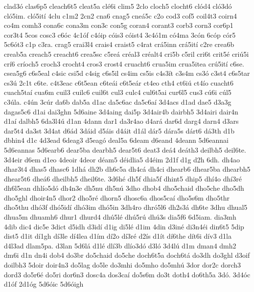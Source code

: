 {clad3^^f3
clas6p5
cleach6t5
cleat5a
cl^^e96i
clim5
2clo
cloch5
clocht6
cl^^f3d4
cl^^f33d^^f3
cl^^f35im.
cl^^f35it^^ed
4clu
c1m2
2cn2
cna6
cnag5
cne^^e15c
c2o
cod3
cof5
coil4t3
coirn4
co4m
comh3
cona6c
cona3m
con3c
con5g
coran4
corant3
corb3
corn3
cor6p1
cor3t4
5cos
cosc3
c6^^f3c
4c1^^f3f
c4^^f3ip
c^^f3is3
c^^f3ist4
3c4^^f31m
c^^f34ma
3c^^f3n
6c^^f3p
c^^f3r5
5c6^^f3t3
c1p
c3ra.
crag5
crai3l4
crais4
craist5
c4rat
cr^^e15inn
cr^^e15it^^ed
c2re
crea6b
creab5a
creach5
creacht6
crea5sc
c5re^^e1
cr^^e9al3
cr^^e9alt4
cri5b
c5ril
cri6t
crit5^^e9
cri^^fa5i
cr^^ed6
cr^^edoch5
croch3
crocht4
cros3
crost4
cruacht6
crua5im
crua5itea
cr^^fa5it^^ed
c6se.
csea5g6
c6s5eal
c4sic
csi5d
c4sig
c6s5il
cs4im
cs5is
c4s3^^edt
c3s4m
cs3^^f3
c3st4
c6s5tar
cs3^^fa
2c1t
c6te.
c4t3eac
c6t5ean
c6te^^e1i
c6t5e^^e1r
ct4eo
cth4
ct6i^^fa
ct4^^edo
cuacht6
cuach5ta^^ed
cua6m
cuil3
cuilc6
cuil6t
cul3
culc4
cul6t5ai
cur6l5
cus3
c^^fa6i
c^^fal5
c3^^fala.
c4^^fan
3c^^far
da6b
dab5a
d1ac
da5c6ac
da5c6a^^ed
3d4acs
d1ad
dae5
d3a3g
dagas5c6
d1ai
dai3ghn
5d6aine
3d4aing
dai5p
3d4air4b
dairbh5
3d4airi
dair4n
d1a^^ed
dalbh5
6da3l4^^fa
d1an
4dann
dar1
da3r4ao
d4ar^^e1
dar6d
darg4
darn4
d3ars
dar5t4
da3st
3d4at
d6^^e1d
3d^^e1id
d5^^e1is
d4^^e1it
d1^^e1l
d^^e1r5
d^^e1ra5s
d^^e1rt6
d^^e13th
d1b
dbhin4
d1c
4d3ead
6deag3
d5eag^^f3
deal5a
6deam
d6eand
4deann
5d6eannai
5d6eannas
5d6earb6
dear5ba
dearbh5
dear5t6
deat3
de^^e14
de^^e1th3
deilbh5
deil6te.
3d4eir
d6em
d1eo
4deoir
4deor
d^^e9am5
d^^e9idlia5
d4^^e9im
2d1f
d1g
d2h
6dh.
dh4ao
dhar3t4
dhas5
dhasc6
1dh^^e1
dh2b
dh6c5a
dh4c^^e1
dh4ci
dhearb6
dhear5ba
dhearbh5
dhear5t6
dhe^^e16
dheilbh5
dheil6te.
3d6h^^e9
dh5f
dhia5f
dhint5
dhip5
dh^^ed4o
dh^^ed3r^^e9
dh6l5ean
dhl^^edo5d^^f3
dh4n3e
dh5nu
dh5n^^fa
3dho
dhob4
dho5chaid
dho5che
dho5dh
dho5ghl
dhoir4n5
dhor2
dho5r^^e9
dhorn5
dhosc6a
dhos5ca^^ed
dho5s6m
dho5thr
dho5thu
dh^^f33f
dh^^f35id^^ed
dh^^f33im
dh^^f35in
3dh4ro
dhr^^f35l6
dh2s3^^e1
dh6te
3dhu
dhual5
dhua5m
dhuamh6
dhur1
dhurd4
dh^^fa5l^^e9
dh^^fa5r^^fa
dh^^fa3s
dia5f6
6d5iam.
dia3mh
4dib
dic4
dic5e
3dict
d5idh
d3id^^ed
d1ig
di5l^^e9
d1im
4din
d3in^^e9
di3n4^^e9i
din6t5
5dip
dist5
d1it
d^^ed1gh
d^^ed3le
d^^ed4lea
d1^^edm
d^^ed2o
d^^ed3r^^e9
d2^^eds
d1^^edt
d^^ed6the
d^^edt6i
d^^edv3
d1la
d4l3ad
dlam5pa.
d3lan
5d6l^^e1
d1l^^e9
dl^^ed3b
dl^^edo3d^^f3
d3l^^f3
3d4l^^fa
d1m
dman4
dmh2
dm6i
d1n
dn4i
dob4
do3br
do5chaid
do5che
doch6t5a
doch6t^^e1
do3dh
do3ghl
d3oif
doilbh3
5doir
doir4n3
do5lag
do5le
do3mhi
do5mho
do5mh^^fa
3dor
dor2c
dorch3
dord3
do5r6^^e9
do5ri
dor6n3
dosc4a
dos3ca^^ed
do5s6m
do3t
doth4
do6th5a
3d^^f3.
3d4^^f3c
d1^^f3f
2d1^^f3g
5d6^^f3ic
5d6^^f3igh
}
